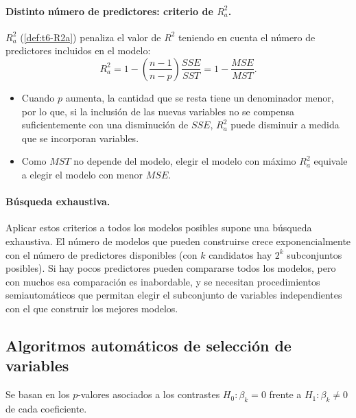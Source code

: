 \paragraph{Distinto número de predictores: criterio de $R^2_a$.} $R^2_a$ (\cref{def:t6-R2a})
penaliza el valor de $R^2$ teniendo en cuenta el número de predictores incluidos en el modelo:
\[
  R^2_a = 1-\left(\frac{n-1}{n-p}\right)\frac{SSE}{SST} = 1-\frac{MSE}{MST}.
\]
\begin{itemize}
  \item Cuando $p$ aumenta, la cantidad que se resta tiene un denominador menor, por lo que, si la
    inclusión de las nuevas variables no se compensa suficientemente con una disminución de $SSE$,
    $R^2_a$ puede disminuir a medida que se incorporan variables.
  \item Como $MST$ no depende del modelo, elegir el modelo con máximo $R^2_a$ equivale a elegir el
    modelo con menor $MSE$.
\end{itemize}

\paragraph{Búsqueda exhaustiva.} Aplicar estos criterios a todos los modelos posibles supone una
búsqueda exhaustiva. El número de modelos que pueden construirse crece exponencialmente con el
número de predictores disponibles (con $k$ candidatos hay $2^k$ subconjuntos posibles). Si hay
pocos predictores pueden compararse todos los modelos, pero con muchos esa comparación es
inabordable, y se necesitan procedimientos semiautomáticos que permitan elegir el subconjunto de
variables independientes con el que construir los mejores modelos.

\subsection{Algoritmos automáticos de selección de variables}

Se basan en los $p$-valores asociados a los contrastes $H_0\colon\beta_k=0$ frente a
$H_1\colon\beta_k\neq0$ de cada coeficiente.

